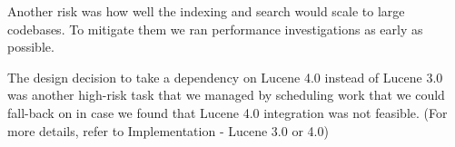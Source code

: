 Another risk was how well the indexing and search would scale to large codebases. To mitigate them we ran performance investigations as early as possible.

The design decision to take a dependency on Lucene 4.0 instead of Lucene 3.0 was another high-risk task that we managed by scheduling work that we could fall-back on in case we found that Lucene 4.0 integration was not feasible. (For more details, refer to Implementation - Lucene 3.0 or 4.0)

